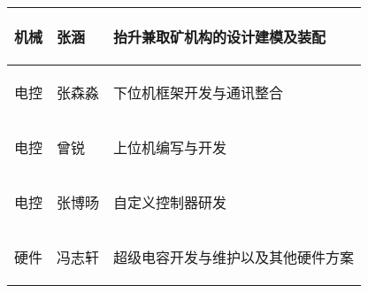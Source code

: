 \begin{longtable}{ p{2cm} | p{3.5cm} | p{9.3cm} |}
    \hline

        \begin{center}
            机械
        \end{center}&
        \begin{center}
            张涵
        \end{center}&
        \begin{center}
            抬升兼取矿机构的设计建模及装配
        \end{center}\\
        
    \hline
    
        \begin{center}
            电控
        \end{center}&
        \begin{center}
            张森淼
        \end{center}&
        \begin{center}
            下位机框架开发与通讯整合
        \end{center}\\

    \hline
    
        \begin{center}
            电控
        \end{center}&
        \begin{center}
            曾锐
        \end{center}&
        \begin{center}
            上位机编写与开发
        \end{center}\\

    \hline

        \begin{center}
            电控
        \end{center}&
        \begin{center}
            张博旸
        \end{center}&
        \begin{center}
            自定义控制器研发
        \end{center}\\
        
    \hline
    
        \begin{center}
            硬件
        \end{center}&
        \begin{center}
            冯志轩
        \end{center}&
        \begin{center}
            超级电容开发与维护以及其他硬件方案
        \end{center}\\

    \hline
    
\end{longtable}
